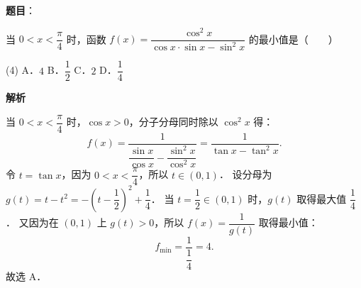 \begin{answer}

\textbf{题目}：

当 $0 < x < \dfrac{\pi}{4}$ 时，函数 $f(x) = \dfrac{\cos^2 x}{\cos x \cdot \sin x - \sin^2 x}$ 的最小值是\mbox{（　　）}

\begin{gkopts}(4)
\task A．$4$
\task B．$\dfrac{1}{2}$
\task C．$2$
\task D．$\dfrac{1}{4}$
\end{gkopts}

\textbf{解析}

当 $0 < x < \dfrac{\pi}{4}$ 时，$\cos x > 0$，分子分母同时除以 $\cos^2 x$ 得：
\nopagebreak[4]
\[
f(x) = \dfrac{1}{\dfrac{\sin x}{\cos x} - \dfrac{\sin^2 x}{\cos^2 x}} = \dfrac{1}{\tan x - \tan^2 x}.
\]
令 $t = \tan x$，因为 $0 < x < \dfrac{\pi}{4}$，所以 $t \in (0, 1)$．
设分母为 $g(t) = t - t^2 = -\left(t - \dfrac{1}{2}\right)^2 + \dfrac{1}{4}$．
当 $t = \dfrac{1}{2} \in (0, 1)$ 时，$g(t)$ 取得最大值 $\dfrac{1}{4}$．
又因为在 $(0, 1)$ 上 $g(t) > 0$，所以 $f(x) = \dfrac{1}{g(t)}$ 取得最小值：
\nopagebreak[4]
\[
f_{\min} = \dfrac{1}{\dfrac{1}{4}} = 4.
\]
故选 A．


\end{answer}
